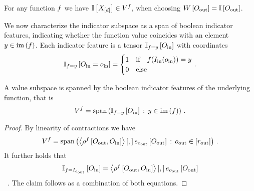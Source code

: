 For any function $f$ we have $\mathbb{I}\left[X_{[d]}\right]\in V^{f}$, when choosing $W\left[O_{\mathrm{out}}\right]=\mathbb{I}\left[O_{\mathrm{out}}\right]$.

We now characterize the indicator subspace as a span of boolean indicator features, indicating whether the function value coincides with an element $y\in\mathrm{im}\left(f\right)$.
Each indicator feature is a tensor $\mathbb{I}_{f=y}\left[O_{\mathrm{in}}\right]$ with coordinates
\begin{align*}
    \mathbb{I}_{f=y}\left[O_{\mathrm{in}}=o_{\mathrm{in}}\right]
    = \begin{cases}
          1 & \text{if} \quad f(I_{\mathrm{in}}(o_{\mathrm{in}}))=y \\
          0 & \text{else}
    \end{cases} \, .
\end{align*}

\begin{lemma}
    A value subspace is spanned by the boolean indicator features of the underlying function, that is
    \begin{align*}
        V^{f}
        = \mathrm{span}\left(\mathbb{I}_{f=y}\left[O_{\mathrm{in}}\right] \, : \, y\in\mathrm{im}\left(f\right)\right) \, .
    \end{align*}
\end{lemma}
\begin{proof}
    By linearity of contractions we have
    \begin{align*}
        V^{f} = \mathrm{span}\left(
            \left\langle \rho^{f}\left[O_{\mathrm{out}},O_{\mathrm{in}}\right]\right\rangle \left[ , \right] e_{o_{\mathrm{out}}}\left[O_{\mathrm{out}}\right]
            \,:\, o_{\mathrm{out}} \in [r_{\mathrm{out}}]
        \right) \, .
    \end{align*}
    It further holds that
    \begin{align*}
        \mathbb{I}_{f=I_{o_{\mathrm{out}}}}\left[O_{\mathrm{in}}\right]
        = \left\langle \rho^{f}\left[O_{\mathrm{out}},O_{\mathrm{in}}\right]\right\rangle \left[ , \right] e_{o_{\mathrm{out}}}\left[O_{\mathrm{out}}\right]
    \end{align*} \, .
    The claim follows as a combination of both equations.
\end{proof}






